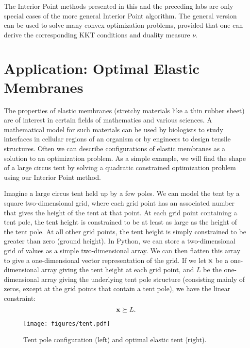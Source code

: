 \begin{info}
The Interior Point methods presented in this and the preceding labs are only special cases of the more general Interior Point algorithm.
The general version can be used to solve many convex optimization problems, provided that one can derive the corresponding KKT conditions and duality measure $\nu$.
\end{info}

\section*{Application: Optimal Elastic Membranes}
The properties of elastic membranes (stretchy materials like a thin rubber sheet) are of interest in certain fields of mathematics and various sciences.
A mathematical model for such materials can be used by biologists to study interfaces in cellular regions of an organism or by engineers to design tensile structures.
Often we can describe configurations of elastic membranes as a solution to an
optimization problem.
As a simple example, we will find the shape of a large circus tent by solving a quadratic constrained optimization problem using our Interior Point method.

Imagine a large circus tent held up by a few poles.
We can model the tent by a square two-dimensional grid, where each grid point has an associated number that gives the height of the tent at that point.
At each grid point containing a tent pole, the tent height is constrained to be at least as large as the height of the tent pole.
At all other grid points, the tent height is simply constrained to be greater than zero (ground height).
In Python, we can store a two-dimensional grid of values as a simple two-dimensional array.
We can then flatten this array to give a one-dimensional vector representation of the grid.
If we let $\mathbf{x}$ be a one-dimensional array giving the tent height at each grid point, and $L$ be the one-dimensional array giving the underlying tent pole structure (consisting mainly of zeros, except at the grid points that contain a tent pole), we have the linear constraint: \[\mathbf{x} \succeq L.\]

\begin{figure}
\texttt{[image: figures/tent.pdf]}
\caption{Tent pole configuration (left) and optimal elastic tent (right).}
\label{fig:tent}
\end{figure}

